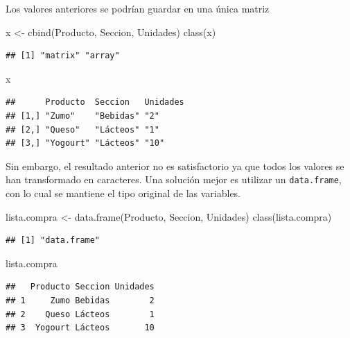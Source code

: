 \documentclass[
]{book}
\newenvironment{Shaded}{\begin{snugshade}}{\end{snugshade}}
\newcommand{\FunctionTok}[1]{\textcolor[rgb]{0.00,0.00,0.00}{#1}}
\newcommand{\NormalTok}[1]{#1}
\newcommand{\OtherTok}[1]{\textcolor[rgb]{0.56,0.35,0.01}{#1}}
\theoremstyle{break}
\begin{document}
Los valores anteriores se podrían guardar en una única matriz

\begin{Shaded}
\begin{Highlighting}[]
\NormalTok{x }\OtherTok{\textless{}{-}} \FunctionTok{cbind}\NormalTok{(Producto, Seccion, Unidades)}
\FunctionTok{class}\NormalTok{(x)}
\end{Highlighting}
\end{Shaded}

\begin{verbatim}
## [1] "matrix" "array"
\end{verbatim}

\begin{Shaded}
\begin{Highlighting}[]
\NormalTok{x}
\end{Highlighting}
\end{Shaded}

\begin{verbatim}
##      Producto  Seccion   Unidades
## [1,] "Zumo"    "Bebidas" "2"     
## [2,] "Queso"   "Lácteos" "1"     
## [3,] "Yogourt" "Lácteos" "10"
\end{verbatim}

Sin embargo, el resultado anterior no es satisfactorio ya que todos
los valores se han transformado en caracteres. Una solución mejor es
utilizar un \texttt{data.frame}, con lo cual se mantiene el tipo original de las variables.

\begin{Shaded}
\begin{Highlighting}[]
\NormalTok{lista.compra }\OtherTok{\textless{}{-}} \FunctionTok{data.frame}\NormalTok{(Producto, Seccion, Unidades)}
\FunctionTok{class}\NormalTok{(lista.compra)}
\end{Highlighting}
\end{Shaded}

\begin{verbatim}
## [1] "data.frame"
\end{verbatim}

\begin{Shaded}
\begin{Highlighting}[]
\NormalTok{lista.compra}
\end{Highlighting}
\end{Shaded}

\begin{verbatim}
##   Producto Seccion Unidades
## 1     Zumo Bebidas        2
## 2    Queso Lácteos        1
## 3  Yogourt Lácteos       10
\end{verbatim}
\end{document}
